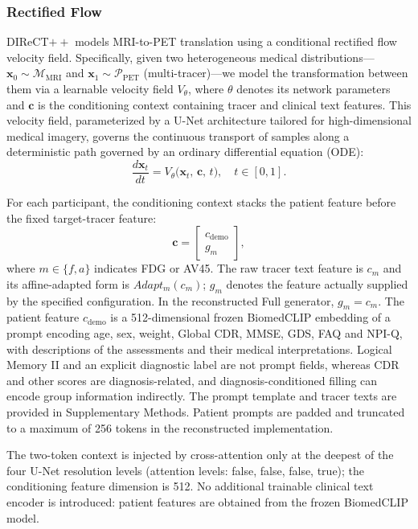 \documentclass{article}
\begin{document}
\subsubsection{Rectified Flow}
DIReCT$++$ models MRI-to-PET translation using a conditional rectified flow velocity field. Specifically, given two heterogeneous medical distributions---$\mathbf{x}_0 \sim \mathcal{M}_{\text{MRI}}$ and $\mathbf{x}_1 \sim \mathcal{P}_{\text{PET}}$ (multi-tracer)---we model the transformation between them via a learnable velocity field $V_\theta$, where $\theta$ denotes its network parameters and $\mathbf{c}$ is the conditioning context containing tracer and clinical text features. This velocity field, parameterized by a U-Net architecture tailored for high-dimensional medical imagery, governs the continuous transport of samples along a deterministic path governed by an ordinary differential equation (ODE):
\begin{equation}
\frac{d\mathbf{x}_t}{dt} = V_\theta\big(\mathbf{x}_t,\, \mathbf{c},\, t\big), \quad t \in [0, 1].
\label{eq:rf_ode}
\end{equation}

For each participant, the conditioning context stacks the patient feature before the fixed target-tracer feature:
\begin{equation}
\mathbf{c}=\begin{bmatrix}c_{\mathrm{demo}}\\g_m\end{bmatrix},
\label{eq:composite_conditioning}
\end{equation}
where $m\in\{f,a\}$ indicates FDG or AV45. The raw tracer text feature is $c_m$ and its affine-adapted form is $Adapt_m(c_m)$; $g_m$ denotes the feature actually supplied by the specified configuration. In the reconstructed Full generator, $g_m=c_m$. The patient feature $c_{\mathrm{demo}}$ is a 512-dimensional frozen BiomedCLIP embedding of a prompt encoding age, sex, weight, Global CDR, MMSE, GDS, FAQ and NPI-Q, with descriptions of the assessments and their medical interpretations. Logical Memory II and an explicit diagnostic label are not prompt fields, whereas CDR and other scores are diagnosis-related, and diagnosis-conditioned filling can encode group information indirectly. The prompt template and tracer texts are provided in Supplementary Methods. Patient prompts are padded and truncated to a maximum of 256 tokens in the reconstructed implementation.

The two-token context is injected by cross-attention only at the deepest of the four U-Net resolution levels (attention levels: false, false, false, true); the conditioning feature dimension is 512. No additional trainable clinical text encoder is introduced: patient features are obtained from the frozen BiomedCLIP model.
\end{document}
